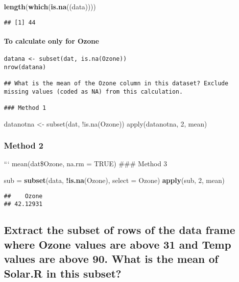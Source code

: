 \documentclass[]{article}
\newenvironment{Shaded}{\begin{snugshade}}{\end{snugshade}}
\newcommand{\DataTypeTok}[1]{\textcolor[rgb]{0.13,0.29,0.53}{#1}}
\newcommand{\DecValTok}[1]{\textcolor[rgb]{0.00,0.00,0.81}{#1}}
\newcommand{\KeywordTok}[1]{\textcolor[rgb]{0.13,0.29,0.53}{\textbf{#1}}}
\newcommand{\NormalTok}[1]{#1}
\newcommand{\OperatorTok}[1]{\textcolor[rgb]{0.81,0.36,0.00}{\textbf{#1}}}
\newcommand{\StringTok}[1]{\textcolor[rgb]{0.31,0.60,0.02}{#1}}
\let\oldparagraph\paragraph
\renewcommand{\paragraph}[1]{\oldparagraph{#1}\mbox{}}
\begin{document}
\begin{Shaded}
\begin{Highlighting}[]
\KeywordTok{length}\NormalTok{(}\KeywordTok{which}\NormalTok{(}\KeywordTok{is.na}\NormalTok{((data))))}
\end{Highlighting}
\end{Shaded}

\begin{verbatim}
## [1] 44
\end{verbatim}

\hypertarget{to-calculate-only-for-ozone}{%
\paragraph{To calculate only for
Ozone}\label{to-calculate-only-for-ozone}}

\begin{verbatim}
datana <- subset(dat, is.na(Ozone))
nrow(datana)

## What is the mean of the Ozone column in this dataset? Exclude missing values (coded as NA) from this calculation.

### Method 1
\end{verbatim}

datanotna \textless{}- subset(dat, !is.na(Ozone)) apply(datanotna, 2,
mean)

\hypertarget{method-2-3}{%
\subsubsection{Method 2}\label{method-2-3}}

``` mean(dat\$Ozone, na.rm = TRUE) \#\#\# Method 3

\begin{Shaded}
\begin{Highlighting}[]
\NormalTok{sub =}\StringTok{ }\KeywordTok{subset}\NormalTok{(data, }\OperatorTok{!}\KeywordTok{is.na}\NormalTok{(Ozone), }\DataTypeTok{select =}\NormalTok{ Ozone)}
\KeywordTok{apply}\NormalTok{(sub, }\DecValTok{2}\NormalTok{, mean)}
\end{Highlighting}
\end{Shaded}

\begin{verbatim}
##    Ozone 
## 42.12931
\end{verbatim}

\hypertarget{extract-the-subset-of-rows-of-the-data-frame-where-ozone-values-are-above-31-and-temp-values-are-above-90.-what-is-the-mean-of-solar.r-in-this-subset}{%
\subsection{Extract the subset of rows of the data frame where Ozone
values are above 31 and Temp values are above 90. What is the mean of
Solar.R in this
subset?}\label{extract-the-subset-of-rows-of-the-data-frame-where-ozone-values-are-above-31-and-temp-values-are-above-90.-what-is-the-mean-of-solar.r-in-this-subset}}
\end{document}
